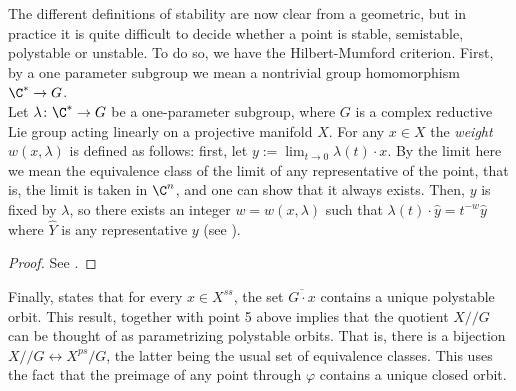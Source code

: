 {The different definitions of stability are now clear from a geometric, but in practice it is quite difficult to decide whether a point is stable, semistable, polystable or unstable. To do so, we have the Hilbert-Mumford criterion. First, by a one parameter subgroup we mean a nontrivial group homomorphism \(\C^* \to G\). \\

Let \(\lambda\colon \C^* \to G\) be a one-parameter subgroup, where \(G\) is a complex reductive Lie group acting linearly on a projective manifold \(X\). For any \(x\in X\) the \textit{weight} \(w(x, \lambda)\) is defined as follows: first, let \(y:=\lim_{t \to 0} \lambda(t)\cdot x\). By the limit here we mean the equivalence class of the limit of any representative of the point, that is, the limit is taken in \(\C^n\), and one can show that it always exists. Then, \(y\) is fixed by \(\lambda\), so there exists an integer \(w=w(x,\lambda)\) such that \(\lambda(t)\cdot \hat{y}=t^{-w} \hat{y}\) where \(\hat{Y}\) is any representative \(y\) (see \parencite[Sec. 5.2]{hoskins}).

\begin{proof}
    See \parencite[Th. 2.1]{mumford1994geometric}.
\end{proof}

Finally, \parencite[Lemma 4.16]{hoskins} states that for every \(x \in X^{ss}\), the set \(\overline{G\cdot x}\) contains a unique polystable orbit. This result, together with point 5 above implies that the quotient \(X /\!\!/G\) can be thought of as parametrizing polystable orbits. That is, there is a bijection \(X /\!\!/G \leftrightarrow X^{ps}/G\), the latter being the usual set of equivalence classes. This uses the fact \parencite[Cor. 2.39]{hoskins} that the preimage of any point through \(\varphi\) contains a unique closed orbit.



}
